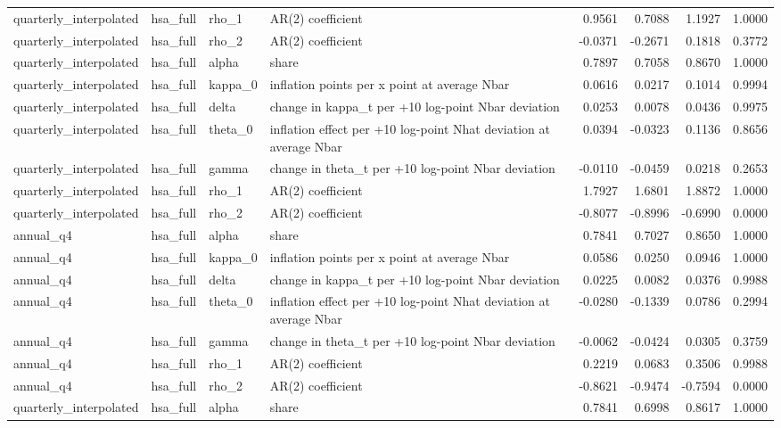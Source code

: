 \begin{tabular}{llllrrrr}
quarterly\_interpolated & hsa\_full & rho\_1 & AR(2) coefficient & 0.9561 & 0.7088 & 1.1927 & 1.0000 \\
quarterly\_interpolated & hsa\_full & rho\_2 & AR(2) coefficient & -0.0371 & -0.2671 & 0.1818 & 0.3772 \\
quarterly\_interpolated & hsa\_full & alpha & share & 0.7897 & 0.7058 & 0.8670 & 1.0000 \\
quarterly\_interpolated & hsa\_full & kappa\_0 & inflation points per x point at average Nbar & 0.0616 & 0.0217 & 0.1014 & 0.9994 \\
quarterly\_interpolated & hsa\_full & delta & change in kappa\_t per +10 log-point Nbar deviation & 0.0253 & 0.0078 & 0.0436 & 0.9975 \\
quarterly\_interpolated & hsa\_full & theta\_0 & inflation effect per +10 log-point Nhat deviation at average Nbar & 0.0394 & -0.0323 & 0.1136 & 0.8656 \\
quarterly\_interpolated & hsa\_full & gamma & change in theta\_t per +10 log-point Nbar deviation & -0.0110 & -0.0459 & 0.0218 & 0.2653 \\
quarterly\_interpolated & hsa\_full & rho\_1 & AR(2) coefficient & 1.7927 & 1.6801 & 1.8872 & 1.0000 \\
quarterly\_interpolated & hsa\_full & rho\_2 & AR(2) coefficient & -0.8077 & -0.8996 & -0.6990 & 0.0000 \\
annual\_q4 & hsa\_full & alpha & share & 0.7841 & 0.7027 & 0.8650 & 1.0000 \\
annual\_q4 & hsa\_full & kappa\_0 & inflation points per x point at average Nbar & 0.0586 & 0.0250 & 0.0946 & 1.0000 \\
annual\_q4 & hsa\_full & delta & change in kappa\_t per +10 log-point Nbar deviation & 0.0225 & 0.0082 & 0.0376 & 0.9988 \\
annual\_q4 & hsa\_full & theta\_0 & inflation effect per +10 log-point Nhat deviation at average Nbar & -0.0280 & -0.1339 & 0.0786 & 0.2994 \\
annual\_q4 & hsa\_full & gamma & change in theta\_t per +10 log-point Nbar deviation & -0.0062 & -0.0424 & 0.0305 & 0.3759 \\
annual\_q4 & hsa\_full & rho\_1 & AR(2) coefficient & 0.2219 & 0.0683 & 0.3506 & 0.9988 \\
annual\_q4 & hsa\_full & rho\_2 & AR(2) coefficient & -0.8621 & -0.9474 & -0.7594 & 0.0000 \\
quarterly\_interpolated & hsa\_full & alpha & share & 0.7841 & 0.6998 & 0.8617 & 1.0000 \\

\end{tabular}
